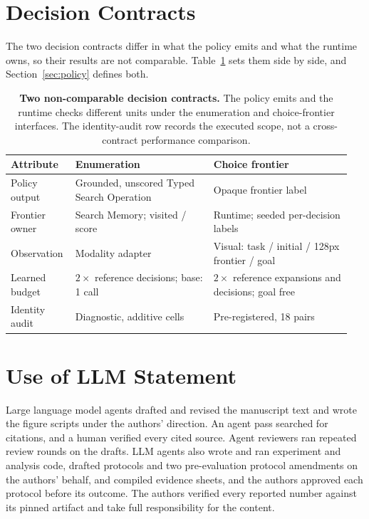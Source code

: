 \section{Decision Contracts}
\label{app:design-contracts}

The two decision contracts differ in what the policy emits and what the runtime owns, so their results are not comparable. Table~\ref{tab:design-contracts} sets them side by side, and Section~\ref{sec:policy} defines both.

\begin{table}[t]
\caption{\textbf{Two non-comparable decision contracts.} The policy emits and the runtime checks different units under the enumeration and choice-frontier interfaces. The identity-audit row records the executed scope, not a cross-contract performance comparison.}
\label{tab:design-contracts}
\centering\footnotesize
\setlength{\tabcolsep}{3pt}
\begin{tabular}{@{}p{0.17\linewidth}p{0.39\linewidth}p{0.39\linewidth}@{}}
\toprule[0.4mm]
\rowcolor{mygray}\textbf{Attribute} & \textbf{Enumeration} & \textbf{Choice frontier} \\
\midrule
Policy output & Grounded, unscored Typed Search Operation & Opaque frontier label \\
Frontier owner & Search Memory; visited / score & Runtime; seeded per-decision labels \\
Observation & Modality adapter & Visual: task / initial / 128px frontier / goal \\
Learned budget & $2\times$ reference decisions; base: 1 call & $2\times$ reference expansions and decisions; goal free \\
Identity audit & Diagnostic, additive cells & Pre-registered, 18 pairs \\
\bottomrule
\end{tabular}
\end{table}

\section{Use of LLM Statement}
\label{app:llm-usage}

Large language model agents drafted and revised the manuscript text and wrote the figure scripts under the authors' direction. An agent pass searched for citations, and a human verified every cited source. Agent reviewers ran repeated review rounds on the drafts. LLM agents also wrote and ran experiment and analysis code, drafted protocols and two pre-evaluation protocol amendments on the authors' behalf, and compiled evidence sheets, and the authors approved each protocol before its outcome. The authors verified every reported number against its pinned artifact and take full responsibility for the content.

